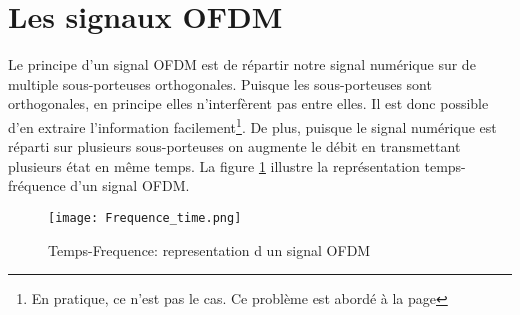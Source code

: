 
\section{Les signaux OFDM}
\label{sec:defofdm}

Le principe d'un signal OFDM est de répartir notre signal numérique sur de
multiple sous-porteuses orthogonales. Puisque les sous-porteuses sont
orthogonales, en principe elles n'interfèrent pas entre elles. Il est donc
possible d'en extraire l'information facilement\footnote{En pratique, ce n'est
  pas le cas. Ce problème est abordé à la page \pageref{sec:ICI}}. De plus,
puisque le signal numérique est réparti sur plusieurs sous-porteuses on augmente
le débit en transmettant plusieurs état en même temps. La figure
\ref{fig:tempsFreq} illustre la représentation temps-fréquence d'un signal OFDM.

\begin{figure}[!h]
  \centering
  \texttt{[image: Frequence\_time.png]}
  \caption[Temps-Frequence]{Temps-Frequence: representation d un signal OFDM}
  \label{fig:tempsFreq}
\end{figure}


